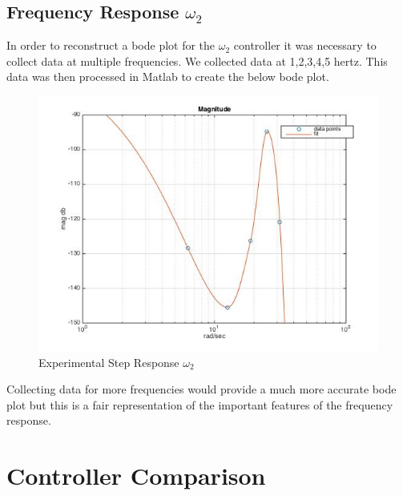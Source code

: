\documentclass[11pt,titlepage]{article}
\begin{document}
	\subsection{Frequency Response $\omega_2$}
		In order to reconstruct a bode plot for the $\omega_2$ controller it was necessary to collect data at multiple frequencies. We collected data at 1,2,3,4,5 hertz. This data was then processed in Matlab to create the below bode plot.
		\begin{figure}[H]
			\centering
			\includegraphics[scale=0.5]{experBodew2}
			\caption{Experimental Step Response $\omega_2$}
		\end{figure}
		Collecting data for more frequencies would provide a much more accurate bode plot but this is a fair representation of the important features of the frequency response.

\section{Controller Comparison}
\end{document}
